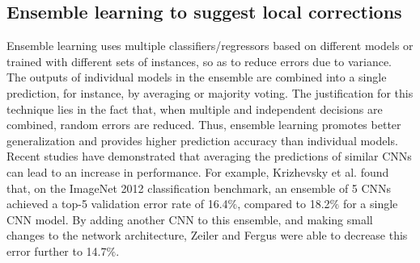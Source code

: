 \documentclass[twoside,espcrc2]{elsarticle}
\begin{document}

\subsection{Ensemble learning to suggest local corrections}


Ensemble learning uses multiple classifiers/regressors based on different models or trained with different sets of instances, so as to reduce errors due to variance. The outputs of individual models in the ensemble are combined into a single prediction, for instance, by averaging or majority voting. The justification for this technique lies in the fact that, when multiple and independent decisions are combined, random errors are reduced. 
Thus, ensemble learning promotes better generalization and provides higher prediction accuracy than individual models. Recent studies have demonstrated that averaging the predictions of similar CNNs can lead to an increase in performance. For example, Krizhevsky et al. \cite{krizhevsky2012imagenet} found that, on the ImageNet 2012 classification benchmark, an ensemble of 5 CNNs achieved a top-5 validation error rate of 16.4$\%$, compared to 18.2$\%$ for a single CNN model. By adding another CNN to this ensemble, and making small changes to the network architecture, Zeiler and Fergus \cite{zeiler2014visualizing} were able to decrease this error further to 14.7$\%$.
\end{document}
